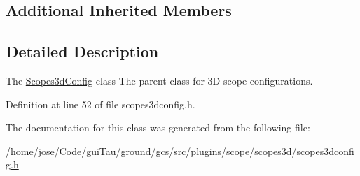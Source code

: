 \subsection*{Additional Inherited Members}


\subsection{Detailed Description}
The \hyperlink{class_scopes3d_config}{Scopes3d\-Config} class The parent class for 3\-D scope configurations. 

Definition at line 52 of file scopes3dconfig.\-h.



The documentation for this class was generated from the following file\-:\begin{DoxyCompactItemize}
\item 
/home/jose/\-Code/gui\-Tau/ground/gcs/src/plugins/scope/scopes3d/\hyperlink{scopes3dconfig_8h}{scopes3dconfig.\-h}\end{DoxyCompactItemize}
